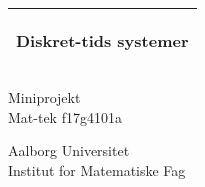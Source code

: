 %
%
%
%
%
\begin{titlepage}
  \addtolength{\hoffset}{0.5\evensidemargin-0.5\oddsidemargin} %
  \noindent%
  \begin{tabular}{@{}p{\textwidth}@{}}
    \toprule[2pt]
    \midrule
    \vspace{0.2cm}
    \begin{center}
    \Huge{\textbf{
      Diskret-tids systemer
    }}
    \end{center}
    \vspace{0.2cm}\\
    \midrule
    \toprule[2pt]
  \end{tabular}
  \begin{center}
    {\large
      Miniprojekt
    }\\
    \vspace{0.2cm}
    {\Large
      Mat-tek f17g4101a
    }
  \end{center}
  
  \begin{center}
  Aalborg Universitet\\
Institut for Matematiske Fag
  \end{center}
\end{titlepage}
\clearpage
